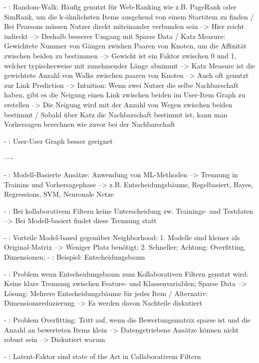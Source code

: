 - \cite[S. 61]{recommenderSystems:2016}: Random-Walk: Häufig genutzt für Web-Ranking wie z.B. PageRank oder SimRank, um die k-ähnlichsten Items ausgehend von einem Startitem zu finden / Bei Pearsons müssen Nutzer direkt miteinander verbunden sein --> Hier reicht indirekt --> Deshalb besserer Umgang mit Sparse Data / Katz Measure: Gewichtete Nummer von Gängen zwishen Paaren von Knoten, um die Affinität zwischen beiden zu bestimmen --> Gewicht ist ein Faktor zwischen 0 und 1, welcher typischerweise mit zunehmender Länge abnimmt --> Katz Measure ist die gewichtete Anzahl von Walks zwischen paaren von Knoten --> Auch oft genutzt zur Link Prediction --> Intuition: Wenn zwei Nutzer die selbe Nachbarschaft haben, gibt es die Neigung einen Link zwischen beiden im User-Item Graph zu erstellen --> Die Neigung wird mit der Anzahl von Wegen zwischen beiden bestimmt / Sobald über Katz die Nachbarschaft bestimmt ist, kann man Vorhersagen berechnen wie zuvor bei der Nachbarschaft

- \cite[S. 61]{recommenderSystems:2016}: User-User Graph besser geeignet

----

- \cite[S. 71]{recommenderSystems:2016}: Modell-Basierte Ansätze: Anwendung von ML-Methoden --> Trennung in Trainins und Vorhersagephase --> z.B. Entscheidungsbäume, Regelbasiert, Bayes, Regressions, SVM, Neuronale Netze

- \cite[S. 72]{recommenderSystems:2016}: Bei kollaborativem Filtern keine Unterscheidung zw. Trainings- und Testdaten --> Bei Modell-basiert findet diese Trennung statt

- \cite[S. 72]{recommenderSystems:2016}: Vorteile Model-based gegenüber Neighborhood: 1. Modelle sind kleiner als Original-Matrix --> Weniger Platz benötigt; 2. Schneller; Achtung: Overfitting, Dimensionen;
- \cite[S. 74]{recommenderSystems:2016}: Beispiel: Entscheidungsbaum

- \cite[S. 76]{recommenderSystems:2016}: Problem wenn Entscheidungsbaum zum Kollaborativen Filtern genutzt wird: Keine klare Trennung zwischen Feature- und Klassenvariablen; Sparse Data --> Lösung: Mehrere Entscheidungsbäume für jedes Item / Alternativ: Dimensionsreduzierung --> Es werden davon Nachteile diskutiert

- \cite[S. 84]{recommenderSystems:2016}: Problem Overfitting: Tritt auf, wenn die Bewertungsmatrix sparse ist und die Anzahl an bewerteten Items klein --> Datengetriebene Ansätze können nicht robust sein --> Diskutiert warum

- \cite[S. 134]{recommenderSystems:2016}: Latent-Faktor sind state of the Art in Collaborativem Filtern


